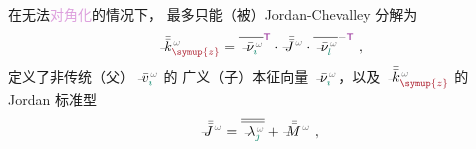  在无法\textcolor{Plum}{对角化}的情况下， 最多只能（被）\textcolor{PineGreen}{Jordan-Chevalley 分解}为
\begin{align} \label{eq:kz-Jordan_decompose}
	\Xint{\begin{smallmatrix} ~ \\ {}^{}_{\mathcolor{gray}{-}} \\ ~ \end{smallmatrix}}{15}{\bar{\bar{k}}}_{\textcolor{Maroon}{\symup{z}}}^{\;\! \mathcolor{gray}{\omega}} = \overline{\Xint{\begin{smallmatrix} ~ \\ {}^{}_{\mathcolor{gray}{-}} \\ ~ \end{smallmatrix}}{15}{\bar{\nu}}^{\;\!\mathcolor{gray}{\omega}}_{\textcolor{PineGreen}{\imath}}}^{\mathsf{\textcolor{Plum}{T}}} \cdot \Xint{\mathcolor{gray}{-}}{25}{\bar{\bar{J}}}^{\;\!\mathcolor{gray}{\omega}} \cdot \overline{\Xint{\begin{smallmatrix} ~ \\ {}^{}_{\mathcolor{gray}{-}} \\ ~ \end{smallmatrix}}{15}{\bar{\nu}}^{\;\!\mathcolor{gray}{\omega}}_{\textcolor{PineGreen}{l}}}^{-{\mathsf{\textcolor{Plum}{T}}}} ~,
\end{align}
定义了非传统（父）$\Xint{\begin{smallmatrix} ~ \\ {}^{}_{\mathcolor{gray}{-}} \\ ~ \end{smallmatrix}}{15}{\bar{v}}^{\;\!\mathcolor{gray}{\omega}}_{\textcolor{PineGreen}{\imath}}$ 的 广义（子）\textcolor{PineGreen}{本征向量} $\Xint{\begin{smallmatrix} ~ \\ {}^{}_{\mathcolor{gray}{-}} \\ ~ \end{smallmatrix}}{15}{\bar{\nu}}^{\;\!\mathcolor{gray}{\omega}}_{\textcolor{PineGreen}{\imath}}$，以及 $\Xint{\begin{smallmatrix} ~ \\ {}^{}_{\mathcolor{gray}{-}} \\ ~ \end{smallmatrix}}{15}{\bar{\bar{k}}}_{\textcolor{Maroon}{\symup{z}}}^{\;\! \mathcolor{gray}{\omega}}$ 的 \textcolor{PineGreen}{Jordan 标准型}
\begin{align} \label{eq:kz-Jordan_normal_form}
	\Xint{\mathcolor{gray}{-}}{25}{\bar{\bar{J}}}^{\;\!\mathcolor{gray}{\omega}} = \overline{\overline{\Xint{\begin{smallmatrix} ~ \\ {}^{}_{\mathcolor{gray}{-}} \\ ~ \end{smallmatrix}}{22}{\lambda}^{\;\!\mathcolor{gray}{\omega}}_{\textcolor{PineGreen}{\jmath}}}} + \Xint{\mathcolor{gray}{-}}{18}{\bar{\bar{M}}}^{\;\!\mathcolor{gray}{\omega}} ~,
\end{align}
